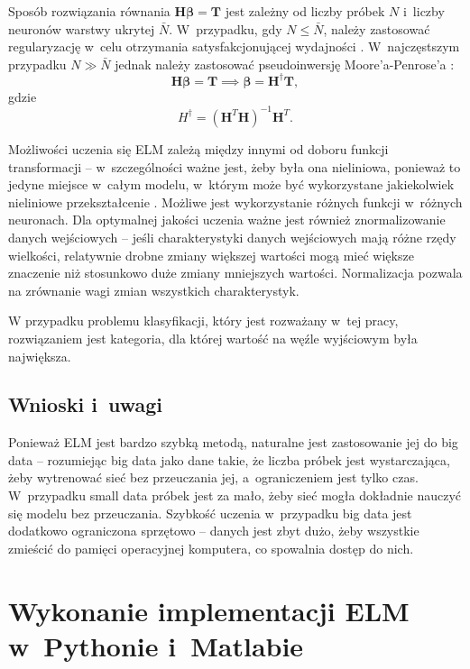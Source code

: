 \documentclass[pl]{minipw} %
\begin{document}
Sposób rozwiązania równania $\bm{H}\bm{\beta}=\bm{T}$ jest zależny od liczby próbek $N$ i~liczby neuronów warstwy ukrytej $\bar{N}$. W~przypadku, gdy $N \leq \bar{N}$, należy zastosować regularyzację w~celu otrzymania satysfakcjonującej wydajności \cite{akusok-hpelm}. W~najczęstszym przypadku $N \gg \bar{N}$ jednak należy zastosować pseudoinwersję Moore'a-Penrose'a \cite{huang-elm-base}:
\begin{equation}
\bm{H}\bm{\beta}=\bm{T} \implies \bm{\beta}=\bm{H}^{\dagger}\bm{T},
\end{equation}
gdzie 
\begin{equation}
{H}^{\dagger} = (\bm{H}^T \bm{H})^{-1}\bm{H}^T.
\end{equation}

Możliwości uczenia się ELM zależą między innymi od doboru funkcji transformacji -- w~szczególności ważne jest, żeby była ona nieliniowa, ponieważ to jedyne miejsce w~całym modelu, w~którym może być wykorzystane jakiekolwiek nieliniowe przekształcenie \cite{akusok-hpelm}. Możliwe jest wykorzystanie różnych funkcji w~różnych neuronach. Dla optymalnej jakości uczenia ważne jest również znormalizowanie danych wejściowych -- jeśli charakterystyki danych wejściowych mają różne rzędy wielkości, relatywnie drobne zmiany większej wartości mogą mieć większe znaczenie niż stosunkowo duże zmiany mniejszych wartości. Normalizacja pozwala na zrównanie wagi zmian wszystkich charakterystyk. \par

W przypadku problemu klasyfikacji, który jest rozważany w~tej pracy, rozwiązaniem jest kategoria, dla której wartość na węźle wyjściowym była największa. 
\section{Wnioski i~uwagi}
Ponieważ ELM jest bardzo szybką metodą, naturalne jest zastosowanie jej do big data -- rozumiejąc big data jako dane takie, że liczba próbek jest wystarczająca, żeby wytrenować sieć bez przeuczania jej, a~ograniczeniem jest tylko czas. W~przypadku small data próbek jest za mało, żeby sieć mogła dokładnie nauczyć się modelu bez przeuczania. Szybkość uczenia w~przypadku big data jest dodatkowo ograniczona sprzętowo -- danych jest zbyt dużo, żeby wszystkie zmieścić do pamięci operacyjnej komputera, co spowalnia dostęp do nich.

\clearpage
\chapter{Wykonanie implementacji ELM w~Pythonie i~Matlabie}
\end{document}
